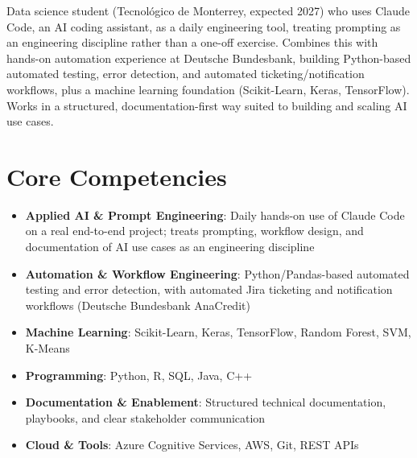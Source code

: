 \documentclass[11pt,a4paper,sans]{moderncv}
\begin{document}
\makecvtitle


\vspace{6pt}
\small{Data science student (Tecnológico de Monterrey, expected 2027) who uses Claude Code, an AI coding assistant, as a daily engineering tool, treating prompting as an engineering discipline rather than a one-off exercise. Combines this with hands-on automation experience at Deutsche Bundesbank, building Python-based automated testing, error detection, and automated ticketing/notification workflows, plus a machine learning foundation (Scikit-Learn, Keras, TensorFlow). Works in a structured, documentation-first way suited to building and scaling AI use cases.}


\section{Core Competencies}
\vspace{1pt}
\begin{itemize}

\item \textbf{Applied AI \& Prompt Engineering}: Daily hands-on use of Claude Code on a real end-to-end project; treats prompting, workflow design, and documentation of AI use cases as an engineering discipline

\item \textbf{Automation \& Workflow Engineering}: Python/Pandas-based automated testing and error detection, with automated Jira ticketing and notification workflows (Deutsche Bundesbank AnaCredit)

\item \textbf{Machine Learning}: Scikit-Learn, Keras, TensorFlow, Random Forest, SVM, K-Means

\item \textbf{Programming}: Python, R, SQL, Java, C++

\item \textbf{Documentation \& Enablement}: Structured technical documentation, playbooks, and clear stakeholder communication

\item \textbf{Cloud \& Tools}: Azure Cognitive Services, AWS, Git, REST APIs

\end{itemize}
\end{document}
